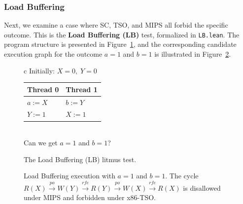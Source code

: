 \subsubsection{Load Buffering}

Next, we examine a case where SC, TSO, and MIPS all forbid the specific outcome. This is the \textbf{Load Buffering (LB)} test, formalized in \texttt{LB.lean}. The program structure is presented in Figure~\ref{fig:lb-program}, and the corresponding candidate execution graph for the outcome $a = 1$ and $b = 1$ is illustrated in Figure~\ref{fig:lb-rfe-cycle}.

\begin{figure}[ht]
\centering
\begin{tabular}{c}
Initially: $X = 0,\; Y = 0$ \\[6pt]
\begin{tabular}{l|l}
Thread 0 & Thread 1 \\
\hline
$a := X$ & $b := Y$ \\
$Y := 1$ & $X := 1$ \\
\end{tabular} \\[6pt]
Can we get $a = 1$ and $b = 1$?
\end{tabular}
\caption{The Load Buffering (LB) litmus test.}
\label{fig:lb-program}
\end{figure}

\begin{figure}[ht]
\centering
{}
\caption{Load Buffering execution with $a = 1$ and $b = 1$.
  The cycle $R(X) \xrightarrow{\mathit{po}} W(Y) \xrightarrow{\mathit{rfe}} R(Y) \xrightarrow{\mathit{po}} W(X) \xrightarrow{\mathit{rfe}} R(X)$
  is disallowed under MIPS and forbidden under x86-TSO.}
\label{fig:lb-rfe-cycle}
\end{figure}

